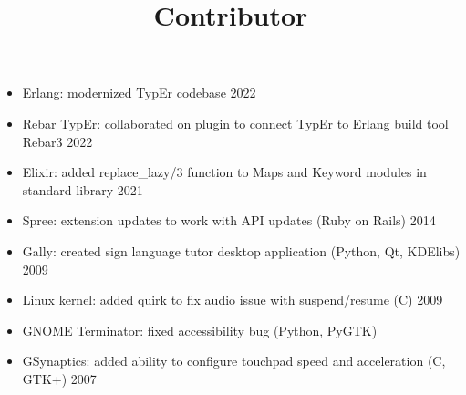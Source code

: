         \dates{}
        \location{}
        \title{Contributor}
        \begin{position}
           \vspace{-12pt}\begin{itemize}
	           \item Erlang: modernized TypEr codebase 2022
	           \item Rebar TypEr: collaborated on plugin to connect TypEr to Erlang build tool Rebar3 2022
	           \item Elixir: added replace\_lazy/3 function to Maps and Keyword modules in standard library 2021
	            \item Spree: extension updates to work with API updates (Ruby on Rails) 2014
	            \item Gally: created sign language tutor desktop application (Python, Qt, KDElibs) 2009
	            \item Linux kernel: added quirk to fix audio issue with suspend/resume (C) 2009
	            \item GNOME Terminator: fixed accessibility bug (Python, PyGTK)
	            \item GSynaptics: added ability to configure touchpad speed and acceleration (C, GTK+) 2007
			\end{itemize}
        \end{position}
